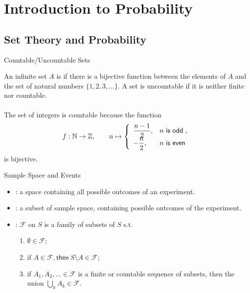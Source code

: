 \section{Introduction to Probability}

\subsection{Set Theory and Probability}

\begin{frame}{Countable/Uncountable Sets}

\justifying
{} An infinite set $A$ is  if there is a bijective function between the elements of $A$ and the set of natural numbers $\{1, 2, 3, \ldots\}$. A set is uncountable if it is neither finite nor countable.
~\\
~\\
\justifying
{} The set of integers is countable because the function
\begin{align*}
f: \mathbb{N}\rightarrow \mathbb{Z}, \qquad n\mapsto \left\{
\begin{array}{ll}
\dfrac{n-1}{2}, & n\mathsf{\ is\ odd\ }, \\
-\dfrac{n}{2}, & n\mathsf{\ is\ even\ }
\end{array}
\right.
\end{align*}
is bijective.

\end{frame}

\begin{frame}{Sample Space and Events}

\begin{itemize}
	\justifying
	\item {}: a space containing all possible outcomes of an experiment.
	\item {}: a subset of sample space, containing possible outcomes of the experiment.
	\item {}: $\mathcal{F}$ on $S$ is a family of subsets of $S$ s.t.
	\begin{enumerate}
		\justifying
		\item $\emptyset\in \mathcal{F}$;
		\item if $A\in \mathcal{F}, \mathsf{then\ } S\setminus A \in \mathcal{F}$;
		\item if $A_1, A_2, \ldots \in \mathcal{F}$ is a finite or countable sequence of subsets, then the union $\bigcup_k A_k\in \mathcal{F}$.
	\end{enumerate}
\end{itemize}

\end{frame}

